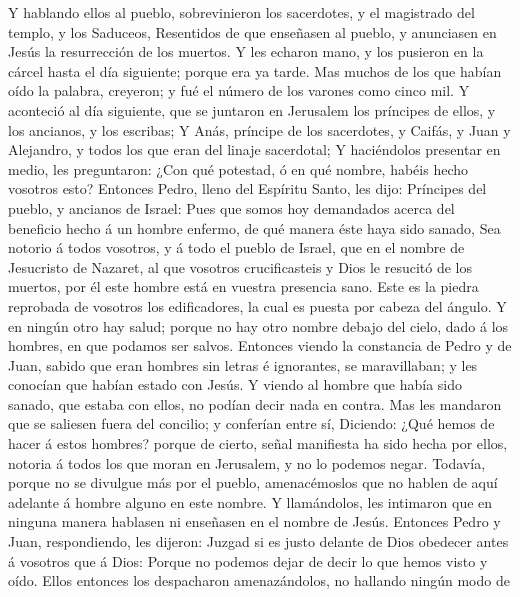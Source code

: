  Y hablando ellos al pueblo, sobrevinieron los sacerdotes, y
el magistrado del templo, y los Saduceos,  Resentidos de que
enseñasen al pueblo, y anunciasen en Jesús la resurrección de los
muertos.  Y les echaron mano, y los pusieron en la cárcel
hasta el día siguiente; porque era ya tarde.  Mas muchos de
los que habían oído la palabra, creyeron; y fué el número de los varones
como cinco mil.  Y aconteció al día siguiente, que se
juntaron en Jerusalem los príncipes de ellos, y los ancianos, y los
escribas;  Y Anás, príncipe de los sacerdotes, y Caifás, y
Juan y Alejandro, y todos los que eran del linaje sacerdotal;
 Y haciéndolos presentar en medio, les preguntaron: ¿Con qué
potestad, ó en qué nombre, habéis hecho vosotros esto? 
Entonces Pedro, lleno del Espíritu Santo, les dijo: Príncipes del
pueblo, y ancianos de Israel:  Pues que somos hoy demandados
acerca del beneficio hecho á un hombre enfermo, de qué manera éste haya
sido sanado,  Sea notorio á todos vosotros, y á todo el
pueblo de Israel, que en el nombre de Jesucristo de Nazaret, al que
vosotros crucificasteis y Dios le resucitó de los muertos, por él este
hombre está en vuestra presencia sano.  Este es la piedra
reprobada de vosotros los edificadores, la cual es puesta por cabeza del
ángulo.  Y en ningún otro hay salud; porque no hay otro
nombre debajo del cielo, dado á los hombres, en que podamos ser salvos.
 Entonces viendo la constancia de Pedro y de Juan, sabido
que eran hombres sin letras é ignorantes, se maravillaban; y les
conocían que habían estado con Jesús.  Y viendo al hombre
que había sido sanado, que estaba con ellos, no podían decir nada en
contra.  Mas les mandaron que se saliesen fuera del
concilio; y conferían entre sí,  Diciendo: ¿Qué hemos de
hacer á estos hombres? porque de cierto, señal manifiesta ha sido hecha
por ellos, notoria á todos los que moran en Jerusalem, y no lo podemos
negar.  Todavía, porque no se divulgue más por el pueblo,
amenacémoslos que no hablen de aquí adelante á hombre alguno en este
nombre.  Y llamándolos, les intimaron que en ninguna manera
hablasen ni enseñasen en el nombre de Jesús.  Entonces
Pedro y Juan, respondiendo, les dijeron: Juzgad si es justo delante de
Dios obedecer antes á vosotros que á Dios:  Porque no
podemos dejar de decir lo que hemos visto y oído.  Ellos
entonces los despacharon amenazándolos, no hallando ningún modo de

